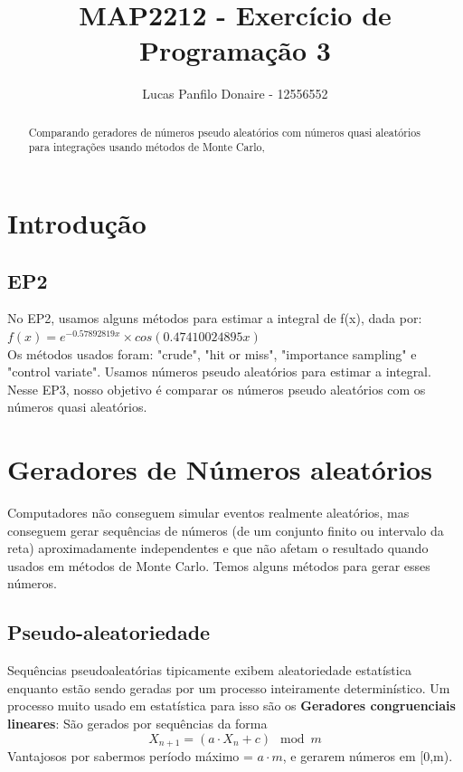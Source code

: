 \documentclass{article}
\title{MAP2212 - Exercício de Programação 3}
\author{Lucas Panfilo Donaire - 12556552}
\begin{document}
\maketitle

\newcommand{\PR}[1]{\ensuremath{\left[#1\right]}}
\newcommand{\PC}[1]{\ensuremath{\left(#1\right)}}
\newcommand{\chav}[1]{\ensuremath{\left\{#1\right\}}}

\begin{abstract}
Comparando geradores de números pseudo aleatórios com números quasi aleatórios para integrações usando métodos de Monte Carlo,
\end{abstract}

\section{Introdução}
\subsection{EP2}
No EP2, usamos alguns métodos para estimar a integral de f(x), dada por: \\
$f(x) = e^{-0.57892819x}\times cos(0.47410024895x)$ \\

Os métodos usados foram: "crude", "hit or miss", "importance sampling" e "control variate". Usamos números pseudo aleatórios para estimar a integral. Nesse EP3, nosso objetivo é comparar os números pseudo aleatórios com os números quasi aleatórios.

\section{Geradores de Números aleatórios}
Computadores não conseguem simular eventos realmente aleatórios, mas conseguem gerar sequências de números (de um conjunto finito ou intervalo da reta) aproximadamente independentes e que não afetam o resultado quando usados em métodos de Monte Carlo. Temos alguns métodos para gerar esses números.

\subsection{Pseudo-aleatoriedade}
Sequências pseudoaleatórias tipicamente exibem aleatoriedade estatística enquanto estão sendo geradas por um processo inteiramente determinístico. Um processo muito usado em estatística para isso são os  \textbf{Geradores congruenciais lineares}:
São gerados por sequências da forma
\[
X_{n+1} = (a \cdot X_n + c) \mod m
\]
Vantajosos por sabermos período máximo = $a \cdot m$, e gerarem números em [0,m).
\end{document}
